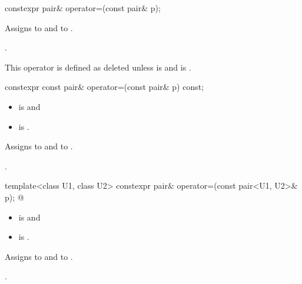 \documentclass{wg21}
\begin{document}
%
\begin{itemdecl}
    constexpr pair& operator=(const pair& p);
\end{itemdecl}

\begin{itemdescr}
    \pnum
    \effects
    Assigns  to  and  to .
    
    \pnum
    \returns
    .
    
    \pnum
    \remarks
    This operator is defined as deleted unless
     is  and
     is .
\end{itemdescr}

%
\begin{itemdecl}
    constexpr const pair& operator=(const pair& p) const;
\end{itemdecl}

\begin{itemdescr}
    \pnum
    \constraints
    \begin{itemize}
        \item
         is  and
        \item
         is .
    \end{itemize}
    
    \pnum
    \effects
    Assigns  to  and  to .
    
    \pnum
    \returns
    .
\end{itemdescr}

%
\begin{itemdecl}
template<class U1, class U2> 
constexpr pair& operator=(const pair<U1, U2>& p);
@
\end{itemdecl}

\begin{itemdescr}

    \pnum
    \constraints
    \begin{itemize}
        \item {} is  and
        \item {} is .
    \end{itemize}
    
    \pnum
    \effects
    Assigns  to  and 
     to .
    
    \pnum
    \returns
    .
\end{itemdescr}
\end{document}
